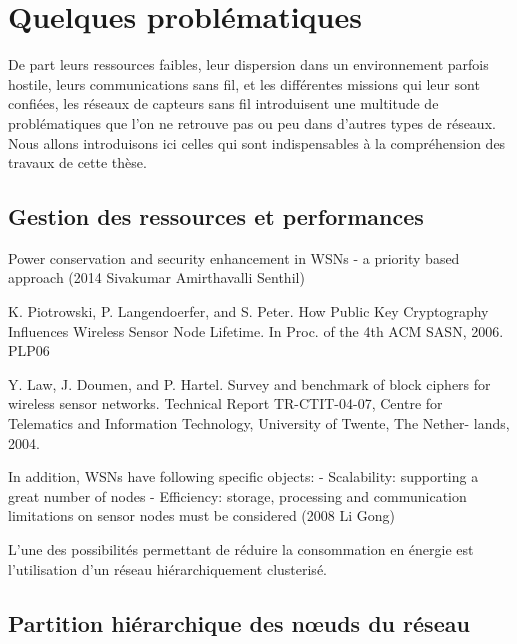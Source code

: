 \section{Quelques problématiques}

De part leurs ressources faibles, leur dispersion dans un environnement parfois hostile, leurs communications sans fil, et les différentes missions qui leur sont confiées, les réseaux de capteurs sans fil introduisent une multitude de problématiques que l'on ne retrouve pas ou peu dans d'autres types de réseaux.
Nous allons introduisons ici celles qui sont indispensables à la compréhension des travaux de cette thèse.

    \subsection{Gestion des ressources et performances}


Power conservation and security enhancement in WSNs - a priority based approach (2014 Sivakumar Amirthavalli Senthil)

K. Piotrowski, P. Langendoerfer, and S. Peter. How Public Key Cryptography Influences Wireless Sensor Node Lifetime. In Proc. of the 4th ACM SASN, 2006.
PLP06

Y. Law, J. Doumen, and P. Hartel. Survey and benchmark of block ciphers for wireless sensor networks. Technical Report TR-CTIT-04-07, Centre for Telematics and Information Technology, University of Twente, The Nether- lands, 2004.


In addition, WSNs have following specific objects:
- Scalability: supporting a great number of nodes
- Efficiency: storage, processing and communication limitations on sensor nodes must be
considered
(2008 Li Gong)


L'une des possibilités permettant de réduire la consommation en énergie est l'utilisation d'un réseau hiérarchiquement clusterisé.

    \subsection{Partition hiérarchique des nœuds du réseau}
    \label{st:subsec:partition}

